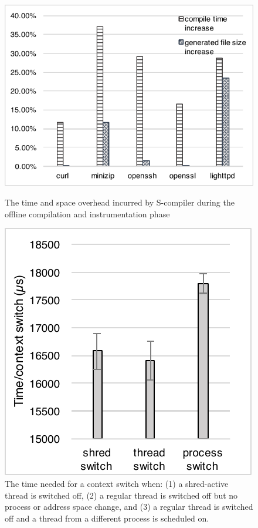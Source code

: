 \begin{figure}[tbp]
	\centering
	\begin{minipage}[b]{0.4\textwidth}
		\centering	
			\includegraphics[scale=0.85]{shreds/figures/compile_overhead}
			\caption{The time and space overhead incurred by S-compiler during the offline compilation and instrumentation phase}
			\label{fig:compile}
	\end{minipage}
 \hfill
	\begin{minipage}[b]{0.4\textwidth}
		\centering	
\includegraphics[scale=0.8]{shreds/figures/ctx_switch}
\caption{The time needed for a context switch when: (1) a shred-active thread is switched off, (2) a regular thread is switched off but no process or address space change,  and (3) a regular thread is switched off and a thread from a different process is scheduled on.}
\label{fig:ctxswtich}
	\end{minipage}
\end{figure}


